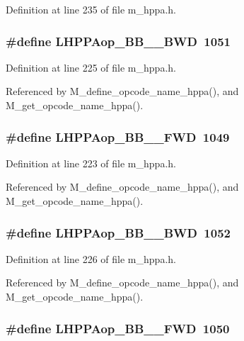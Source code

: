 Definition at line 235 of file m\_\-hppa.h.
\subsubsection{\setlength{\rightskip}{0pt plus 5cm}\#define LHPPAop\_\-BB\_\_\-BWD~1051}\label{m__hppa_8h_904e7883134de02cb707d297456b0697}




Definition at line 225 of file m\_\-hppa.h.

Referenced by M\_\-define\_\-opcode\_\-name\_\-hppa(), and M\_\-get\_\-opcode\_\-name\_\-hppa().
\subsubsection{\setlength{\rightskip}{0pt plus 5cm}\#define LHPPAop\_\-BB\_\_\-FWD~1049}\label{m__hppa_8h_fbcbcd3b43c5b8aff15a21c973e2983c}




Definition at line 223 of file m\_\-hppa.h.

Referenced by M\_\-define\_\-opcode\_\-name\_\-hppa(), and M\_\-get\_\-opcode\_\-name\_\-hppa().
\subsubsection{\setlength{\rightskip}{0pt plus 5cm}\#define LHPPAop\_\-BB\_\_\-BWD~1052}\label{m__hppa_8h_6866a25c17a9c6209e4793a6216875db}




Definition at line 226 of file m\_\-hppa.h.

Referenced by M\_\-define\_\-opcode\_\-name\_\-hppa(), and M\_\-get\_\-opcode\_\-name\_\-hppa().
\subsubsection{\setlength{\rightskip}{0pt plus 5cm}\#define LHPPAop\_\-BB\_\_\-FWD~1050}\label{m__hppa_8h_f1359054127da49e9256f83fa5d392c1}




